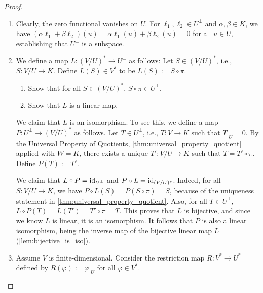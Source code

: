\begin{proof}
  \begin{enumerate}
    \item Clearly, the zero functional vanishes on $U$. For $\ell_1, \ell_2 \in U^\perp$ and $\alpha, \beta \in K$, we have $(\alpha \ell_1 + \beta \ell_2)(u) = \alpha \ell_1(u) + \beta \ell_2(u) = 0$ for all $u \in U$, establishing that $U^\perp$ is a subspace.

    \item We define a map $L \colon (V/U)^* \to U^\perp$ as follows: Let $S \in (V/U)^*$, i.e., $S \colon V/U \to K$. Define $L(S) \in V^*$ to be $L(S) := S \circ \pi$.

    \begin{exercise}
      \label{exc:annihilator_L}
      \begin{enumerate}[label=\textbf{(\alph*)}]
        \item Show that for all $S \in (V/U)^*$, $S \circ \pi \in U^\perp$.
        \item Show that $L$ is a linear map.
      \end{enumerate}
\end{exercise}
    
    We claim that $L$ is an isomorphism. To see this, we define a map $P \colon U^\perp \to (V/U)^*$ as follows. Let $T \in U^\perp$, i.e., $T \colon V \to K$ such that $T|_U = 0$. By the Universal Property of Quotients, \cref{thm:universal_property_quotient} applied with $W = K$, there exists a unique $T' \colon V/U \to K$ such that $T = T' \circ \pi$. Define $P(T) := T'$.

    We claim that $L \circ P = \operatorname{id}_{U^\perp}$ and $P \circ L = \operatorname{id}_{(V/U)^*}$. Indeed, for all $S \colon V/U \to K$, we have $P \circ L(S) = P(S \circ \pi) = S$, because of the uniqueness statement in \cref{thm:universal_property_quotient}. Also, for all $T \in U^\perp$, $L \circ P(T) = L(T') = T' \circ \pi = T$. This proves that $L$ is bijective, and since we know $L$ is linear, it is an isomorphism. It follows that $P$ is also a linear isomorphism, being the inverse map of the bijective linear map $L$ (\cref{lem:bijective_is_iso}).

    \item Assume $V$ is finite-dimensional. Consider the restriction map $R \colon V^* \to U^*$ defined by $R(\varphi) := \varphi|_U$ for all $\varphi \in V^*$. 


\end{enumerate}
\end{proof}

